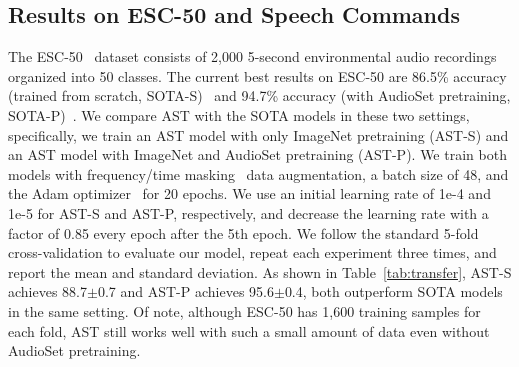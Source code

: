 \documentclass[a4paper]{article}
\begin{document}
\subsection{Results on ESC-50 and Speech Commands}
\label{sec:transfer}
The ESC-50~\cite{piczak2015esc} dataset consists of 2,000 5-second environmental audio recordings organized into 50 classes. The current best results on ESC-50 are 86.5\% accuracy (trained from scratch, SOTA-S)~\cite{sailor2017unsupervised} and 94.7\% accuracy (with AudioSet pretraining, SOTA-P)~\cite{kong2020panns}. We compare AST with the SOTA models in these two settings, specifically, we train an AST model with only ImageNet pretraining (AST-S) and an AST model with ImageNet and AudioSet pretraining (AST-P). We train both models with frequency/time masking~\cite{park2019specaugment} data augmentation, a batch size of 48, and the Adam optimizer~\cite{kingma2015adam} for 20 epochs. We use an initial learning rate of 1e-4 and 1e-5 for AST-S and AST-P, respectively, and decrease the learning rate with a factor of 0.85 every epoch after the 5th epoch. We follow the standard 5-fold cross-validation to evaluate our model, repeat each experiment three times, and report the mean and standard deviation. As shown in Table~\ref{tab:transfer}, AST-S achieves 88.7$\pm$0.7 and AST-P achieves 95.6$\pm$0.4, both outperform SOTA models in the same setting. Of note, although ESC-50 has 1,600 training samples for each fold, AST still works well with such a small amount of data even without AudioSet pretraining.

\end{document}
